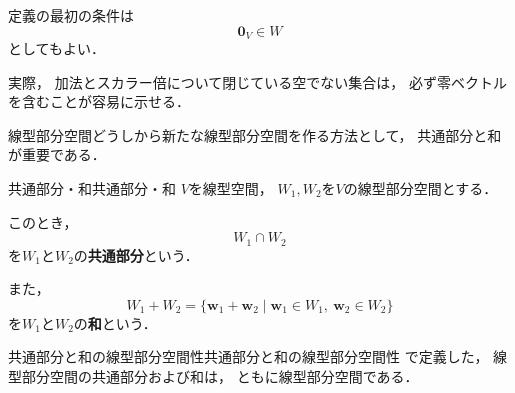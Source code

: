 \begin{mycolumn}
定義の最初の条件は
\[
\bm{0}_V\in W
\]
としてもよい．

実際，
加法とスカラー倍について閉じている空でない集合は，
必ず零ベクトルを含むことが容易に示せる．
\end{mycolumn}

線型部分空間どうしから新たな線型部分空間を作る方法として，
共通部分と和が重要である．

\begin{definition}{共通部分・和}{共通部分・和}
  $V$を線型空間，
  $W_1,W_2$を$V$の線型部分空間とする．

  このとき，
  \[
  W_1\cap W_2
  \]
  を$W_1$と$W_2$の\textbf{共通部分}という．

  また，
  \[
  W_1+W_2
  =
  \{
  \bm{w}_1+\bm{w}_2
  \mid
  \bm{w}_1\in W_1,\
  \bm{w}_2\in W_2
  \}
  \]
  を$W_1$と$W_2$の\textbf{和}という．
\end{definition}

\begin{prop}{共通部分と和の線型部分空間性}{共通部分と和の線型部分空間性}
  で定義した，
  線型部分空間の共通部分および和は，
  ともに線型部分空間である．
\end{prop}

